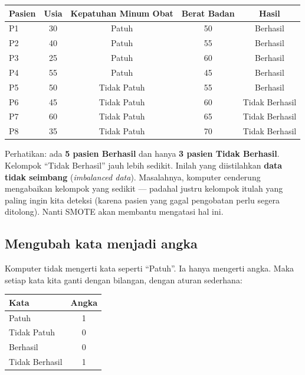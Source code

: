 \documentclass[11pt,a4paper]{article}
\begin{document}
\begin{center}
\begin{tabular}{lcccc}
\toprule
\textbf{Pasien} & \textbf{Usia} & \textbf{Kepatuhan Minum Obat} & \textbf{Berat Badan} & \textbf{Hasil} \\
\midrule
P1 & 30 & Patuh       & 50 & Berhasil \\
P2 & 40 & Patuh       & 55 & Berhasil \\
P3 & 25 & Patuh       & 60 & Berhasil \\
P4 & 55 & Patuh       & 45 & Berhasil \\
P5 & 50 & Tidak Patuh & 55 & Berhasil \\
P6 & 45 & Tidak Patuh & 60 & Tidak Berhasil \\
P7 & 60 & Tidak Patuh & 65 & Tidak Berhasil \\
P8 & 35 & Tidak Patuh & 70 & Tidak Berhasil \\
\bottomrule
\end{tabular}
\end{center}

Perhatikan: ada \textbf{5 pasien Berhasil} dan hanya \textbf{3 pasien Tidak Berhasil}. Kelompok
``Tidak Berhasil'' jauh lebih sedikit. Inilah yang diistilahkan \textbf{data tidak seimbang}
(\emph{imbalanced data}). Masalahnya, komputer cenderung mengabaikan kelompok yang sedikit ---
padahal justru kelompok itulah yang paling ingin kita deteksi (karena pasien yang gagal
pengobatan perlu segera ditolong). Nanti SMOTE akan membantu mengatasi hal ini.

\subsection{Mengubah kata menjadi angka}

Komputer tidak mengerti kata seperti ``Patuh''. Ia hanya mengerti angka. Maka setiap kata kita
ganti dengan bilangan, dengan aturan sederhana:

\begin{center}
\begin{tabular}{lc}
\toprule
\textbf{Kata} & \textbf{Angka} \\
\midrule
Patuh          & 1 \\
Tidak Patuh    & 0 \\
Berhasil       & 0 \\
Tidak Berhasil & 1 \\
\bottomrule
\end{tabular}
\end{center}
\end{document}
